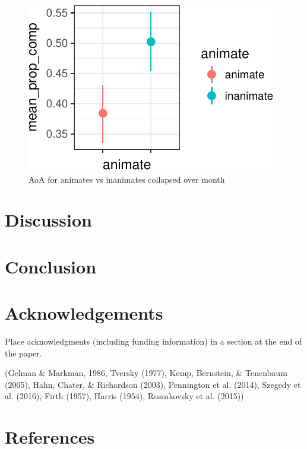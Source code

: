 \documentclass[10pt, letterpaper]{article}
\newenvironment{CodeChunk}{}{}
\begin{document}
\begin{CodeChunk}
\begin{figure}[tb]
\end{figure}
\begin{figure}[tb]
\includegraphics{figs/animacy_aoa_overall-4} \caption[AoA for animates vs inanimates collapsed over month]{AoA for animates vs inanimates collapsed over month}\label{fig:animacy_aoa_overall4}
\end{figure}
\end{CodeChunk}

\section{Discussion}\label{discussion}

\section{Conclusion}\label{conclusion}

\section{Acknowledgements}\label{acknowledgements}

Place acknowledgments (including funding information) in a section at
the end of the paper.

(Gelman \& Markman, 1986, Tversky (1977), Kemp, Bernstein, \& Tenenbaum
(2005), Hahn, Chater, \& Richardson (2003), Pennington et al. (2014),
Szegedy et al. (2016), Firth (1957), Harris (1954), Russakovsky et al.
(2015))

\section{References}\label{references}

\setlength{\parindent}{-0.1in} \setlength{\leftskip}{0.125in} \noindent
\end{document}
